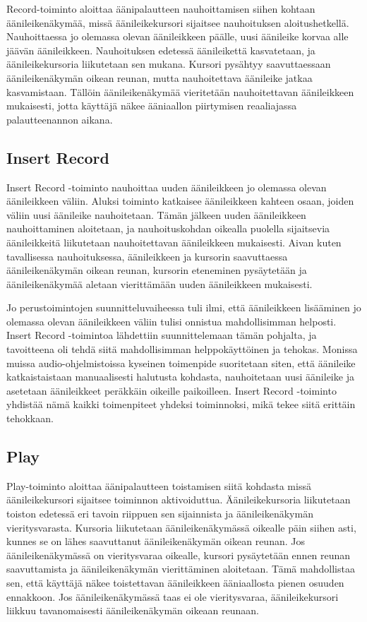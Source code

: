 \documentclass[utf8]{gradu3}
\begin{document}
Record-toiminto aloittaa äänipalautteen nauhoittamisen siihen kohtaan äänileikenäkymää, missä äänileikekursori sijaitsee nauhoituksen aloitushetkellä. Nauhoittaessa jo olemassa olevan äänileikkeen päälle, uusi äänileike korvaa alle jäävän äänileikkeen. Nauhoituksen edetessä äänileikettä kasvatetaan, ja äänileikekursoria liikutetaan sen mukana. Kursori pysähtyy saavuttaessaan äänileikenäkymän oikean reunan, mutta nauhoitettava äänileike jatkaa kasvamistaan. Tällöin äänileikenäkymää vieritetään nauhoitettavan äänileikkeen mukaisesti, jotta käyttäjä näkee ääniaallon piirtymisen reaaliajassa palautteenannon aikana. 

\subsection{Insert Record}

Insert Record -toiminto nauhoittaa uuden äänileikkeen jo olemassa olevan äänileikkeen väliin. Aluksi toiminto katkaisee äänileikkeen kahteen osaan, joiden väliin uusi äänileike nauhoitetaan. Tämän jälkeen uuden äänileikkeen nauhoittaminen aloitetaan, ja nauhoituskohdan oikealla puolella sijaitsevia äänileikkeitä liikutetaan nauhoitettavan äänileikkeen mukaisesti. Aivan kuten tavallisessa nauhoituksessa, äänileikkeen ja kursorin saavuttaessa äänileikenäkymän oikean reunan, kursorin eteneminen pysäytetään ja äänileikenäkymää aletaan vierittämään uuden äänileikkeen mukaisesti.

Jo perustoimintojen suunnitteluvaiheessa tuli ilmi, että äänileikkeen lisääminen jo olemassa olevan äänileikkeen väliin tulisi onnistua mahdollisimman helposti. Insert Record -toimintoa lähdettiin suunnittelemaan tämän pohjalta, ja tavoitteena oli tehdä siitä mahdollisimman helppokäyttöinen ja tehokas. Monissa muissa audio-ohjelmistoissa kyseinen toimenpide suoritetaan siten, että äänileike katkaistaistaan manuaalisesti halutusta kohdasta, nauhoitetaan uusi äänileike ja asetetaan äänileikkeet peräkkäin oikeille paikoilleen. Insert Record -toiminto yhdistää nämä kaikki toimenpiteet yhdeksi toiminnoksi, mikä tekee siitä erittäin tehokkaan.

\subsection{Play}

Play-toiminto aloittaa äänipalautteen toistamisen siitä kohdasta missä äänileikekursori sijaitsee toiminnon aktivoiduttua. Äänileikekursoria liikutetaan toiston edetessä eri tavoin riippuen sen sijainnista ja äänileikenäkymän vieritysvarasta. Kursoria liikutetaan äänileikenäkymässä oikealle päin siihen asti, kunnes se on lähes saavuttanut äänileikenäkymän oikean reunan. Jos äänileikenäkymässä on vieritysvaraa oikealle, kursori pysäytetään ennen reunan saavuttamista ja äänileikenäkymän vierittäminen aloitetaan. Tämä mahdollistaa sen, että käyttäjä näkee toistettavan äänileikkeen ääniaallosta pienen osuuden ennakkoon. Jos äänileikenäkymässä taas ei ole vieritysvaraa, äänileikekursori liikkuu tavanomaisesti äänileikenäkymän oikeaan reunaan.
\end{document}

